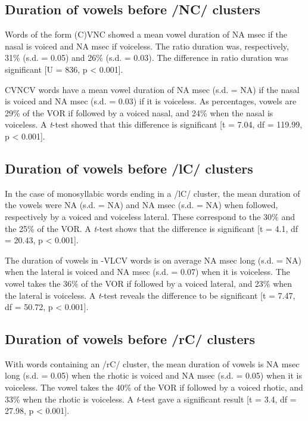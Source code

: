 \documentclass[11pt,a4paper,oneside,openany]{memoir}\usepackage[]{graphicx}\usepackage[]{color}
\begin{document}
\subsection{Duration of vowels before /NC/ clusters}


Words of the form (C)VNC showed a mean vowel duration of NA msec if the nasal is voiced and NA msec if voiceless.
The ratio duration was, respectively, 31\% (s.d. = 0.05) and 26\% (s.d. = 0.03).
The difference in ratio duration was significant [U = 836, p < 0.001].



CVNCV words have a mean vowel duration of NA msec (s.d. = NA) if the nasal is voiced and NA msec  (s.d. = 0.03) if it is voiceless.
As percentages, vowels are 29\% of the VOR if followed by a voiced nasal, and 24\% when the nasal is voiceless.
A \textit{t}-test showed that this difference is significant [t = 7.04, df = 119.99, p < 0.001].


\subsection{Duration of vowels before /lC/ clusters}


In the case of monosyllabic words ending in a /lC/ cluster, the mean duration of the vowels were NA (s.d. = NA) and NA msec (s.d. = NA) when followed, respectively by a voiced and voiceless lateral.
These correspond to the 30\% and the 25\% of the VOR.
A \textit{t}-test shows that the difference is significant [t = 4.1, df = 20.43, p < 0.001].




The duration of vowels in -VLCV words is on average NA msec long (s.d. = NA) when the lateral is voiced and NA msec (s.d. = 0.07) when it is voiceless.
The vowel takes the 36\% of the VOR if followed by a voiced lateral, and 23\% when the lateral is voiceless.
A \textit{t}-test reveals the difference to be significant [t = 7.47, df = 50.72, p < 0.001].

\subsection{Duration of vowels before /rC/ clusters}



With words containing an /rC/ cluster, the mean duration of vowels is NA msec long (s.d. = 0.05) when the rhotic is voiced and NA msec (s.d. = 0.05) when it is voiceless.
The vowel takes the 40\% of the VOR if followed by a voiced rhotic, and 33\% when the rhotic is voiceless.
A \textit{t}-test gave a significant result [t = 3.4, df = 27.98, p < 0.001].
\end{document}
